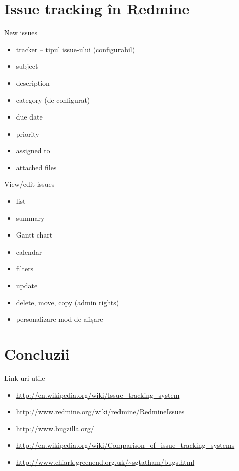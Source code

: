 \documentclass{beamer}
\begin{document}
\section{Issue tracking în Redmine}

\frame{\tableofcontents[currentsection]}

\begin{frame}{New issues}
  \begin{itemize}
    \pause \item tracker -- tipul issue-ului (configurabil)
    \pause \item subject
    \pause \item description
    \pause \item category (de configurat)
    \pause \item due date
    \pause \item priority
    \pause \item assigned to
    \pause \item attached files
  \end{itemize}
\end{frame}

\begin{frame}{View/edit issues}
  \begin{itemize}
    \pause \item list
    \pause \item summary
    \pause \item Gantt chart
    \pause \item calendar
    \pause \item filters
    \pause \item update
    \pause \item delete, move, copy (admin rights)
    \pause \item personalizare mod de afișare
  \end{itemize}
\end{frame}

\section{Concluzii}

\frame{\tableofcontents[currentsection]}

\begin{frame}{Link-uri utile}
  \begin{itemize}
    \item \url{http://en.wikipedia.org/wiki/Issue\_tracking\_system}
    \item \url{http://www.redmine.org/wiki/redmine/RedmineIssues}
    \item \url{http://www.bugzilla.org/}
    \item
\url{http://en.wikipedia.org/wiki/Comparison\_of\_issue\_tracking\_systems}
    \item \url{http://www.chiark.greenend.org.uk/~sgtatham/bugs.html}
  \end{itemize}
\end{frame}
\end{document}
